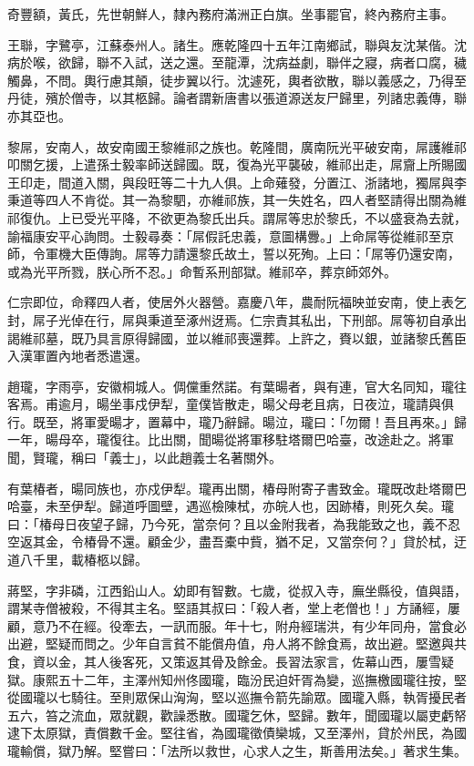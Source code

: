 \begin{pinyinscope}
奇豐額，黃氏，先世朝鮮人，隸內務府滿洲正白旗。坐事罷官，終內務府主事。

王聯，字鷺亭，江蘇泰州人。諸生。應乾隆四十五年江南鄉試，聯與友沈某偕。沈病於喉，欲歸，聯不入試，送之還。至龍潭，沈病益劇，聯伴之寢，病者口腐，穢觸鼻，不問。輿行慮其顛，徒步翼以行。沈遽死，輿者欲散，聯以義感之，乃得至丹徒，殯於僧寺，以其柩歸。論者謂新唐書以張道源送友尸歸里，列諸忠義傳，聯亦其亞也。

黎屌，安南人，故安南國王黎維祁之族也。乾隆間，廣南阮光平破安南，屌護維祁叩關乞援，上遣孫士毅率師送歸國。既，復為光平襲破，維祁出走，屌齎上所賜國王印走，間道入關，與段旺等二十九人俱。上命薙發，分置江、浙諸地，獨屌與李秉道等四人不肯從。其一為黎駟，亦維祁族，其一失姓名，四人者堅請得出關為維祁復仇。上已受光平降，不欲更為黎氏出兵。謂屌等忠於黎氏，不以盛衰為去就，諭福康安平心詢問。士毅尋奏：「屌假託忠義，意圖構釁。」上命屌等從維祁至京師，令軍機大臣傳詢。屌等力請還黎氏故土，誓以死殉。上曰：「屌等仍還安南，或為光平所戮，朕心所不忍。」命暫系刑部獄。維祁卒，葬京師郊外。

仁宗即位，命釋四人者，使居外火器營。嘉慶八年，農耐阮福映並安南，使上表乞封，屌子光倬在行，屌與秉道至涿州迓焉。仁宗責其私出，下刑部。屌等初自承出謁維祁墓，既乃具言原得歸國，並以維祁喪還葬。上許之，賚以銀，並諸黎氏舊臣入漢軍置內地者悉遣還。

趙瓏，字雨亭，安徽桐城人。倜儻重然諾。有葉暘者，與有連，官大名同知，瓏往客焉。甫逾月，暘坐事戍伊犁，童僕皆散走，暘父母老且病，日夜泣，瓏請與俱行。既至，將軍愛暘才，置幕中，瓏乃辭歸。暘泣，瓏曰：「勿爾！吾且再來。」歸一年，暘母卒，瓏復往。比出關，聞暘從將軍移駐塔爾巴哈臺，改途赴之。將軍聞，賢瓏，稱曰「義士」，以此趙義士名著關外。

有葉椿者，暘同族也，亦戍伊犁。瓏再出關，椿母附寄子書致金。瓏既改赴塔爾巴哈臺，未至伊犁。歸道呼圖壁，遇巡檢陳栻，亦皖人也，因跡椿，則死久矣。瓏曰：「椿母日夜望子歸，乃今死，當奈何？且以金附我者，為我能致之也，義不忍空返其金，令椿骨不還。顧金少，盡吾橐中貲，猶不足，又當奈何？」貸於栻，迂道八千里，載椿柩以歸。

蔣堅，字非磷，江西鉛山人。幼即有智數。七歲，從叔入寺，廡坐縣役，值與語，謂某寺僧被殺，不得其主名。堅語其叔曰：「殺人者，堂上老僧也！」方誦經，屢顧，意乃不在經。役牽去，一訊而服。年十七，附舟經瑞洪，有少年同舟，當食必出避，堅疑而問之。少年自言貧不能償舟值，舟人將不餘食焉，故出避。堅邀與共食，資以金，其人後客死，又策返其骨及餘金。長習法家言，佐幕山西，屢雪疑獄。康熙五十二年，主澤州知州佟國瓏，臨汾民迫奸胥為變，巡撫檄國瓏往按，堅從國瓏以七騎往。至則眾保山洶洶，堅以巡撫令箭先諭眾。國瓏入縣，執胥擾民者五六，笞之流血，眾就觀，歡譟悉散。國瓏乞休，堅歸。數年，聞國瓏以屬吏虧帑逮下太原獄，責償數千金。堅往省，為國瓏徵債欒城，又至澤州，貸於州民，為國瓏輸償，獄乃解。堅嘗曰：「法所以救世，心求人之生，斯善用法矣。」著求生集。


\end{pinyinscope}
